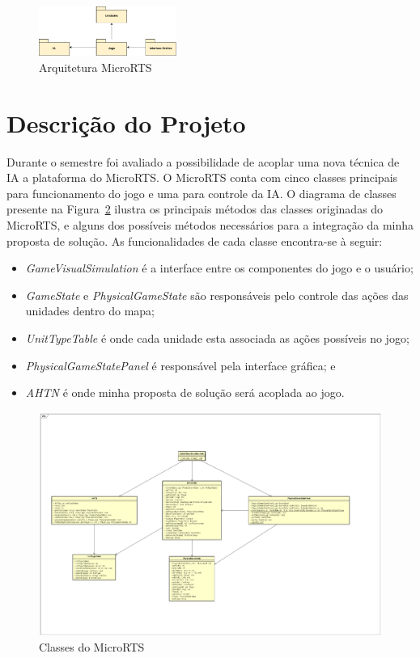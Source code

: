 \begin{figure}[ht]
	\centering
	\includegraphics[width=0.4\textwidth]{fig/pacotes.pdf}
	\caption{Arquitetura MicroRTS}
	\label{fig:pacotes}
\end{figure} 

\section{Descrição do Projeto}

Durante o semestre foi avaliado a possibilidade de acoplar uma nova técnica de IA a plataforma do MicroRTS. O MicroRTS conta com cinco classes principais para funcionamento do jogo e uma para controle da IA. O diagrama de classes presente na Figura~\ref{fig:classes} ilustra os principais métodos das classes originadas do MicroRTS, e alguns dos possíveis métodos necessários para a integração da minha proposta de solução. As funcionalidades de cada classe encontra-se à seguir: 

\begin{itemize}
	\item \textit{GameVisualSimulation} é a interface entre os componentes do jogo e o usuário;
	\item \textit{GameState} e \textit{PhysicalGameState} são responsáveis pelo controle das ações das unidades dentro do mapa;
	\item \textit{UnitTypeTable} é onde cada unidade esta associada as ações possíveis no jogo;
	\item \textit{PhysicalGameStatePanel} é responsável pela interface gráfica; e
	\item \textit{AHTN} é onde minha proposta de solução será acoplada ao jogo.
\end{itemize}

\begin{figure}[ht]
	\centering
	\includegraphics[width=1\textwidth]{fig/classes.pdf}
	\caption{Classes do MicroRTS}
	\label{fig:classes}
\end{figure} 


